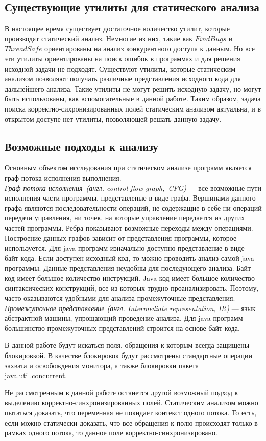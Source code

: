 \subsection{Существующие утилиты для статического анализа}
В настоящее время существует достаточное количество утилит, которые производят статический анализ. Немногие из них, такие как $FindBugs$\cite{FindBugs} и $ThreadSafe$ ориентированы на анализ конкурентного доступа к данным. Но все эти утилиты ориентированы на поиск ошибок в программах и для решения исходной задачи не подходят.
Существуют утилиты, которые статическим анализом позволяют получать различные представления исходного кода для дальнейшего анализа. Такие утилиты не могут решить исходную задачу, но могут быть использованы, как вспомогательные в данной работе. 
Таким образом, задача поиска корректно-сихронизированных полей статическим анализом актуальна, и в открытом доступе нет утилиты, позволяющей решать данную задачу. 
\subsection{Возможные подходы к анализу}
Основным объектом исследования при статическом анализе программ является граф потока исполнения выполнения. 
\\\emph{Граф потока исполнения\ (англ. control flow graph,\ CFG)} --- все возможные пути исполнения части программы, представленые в виде графа. Вершинами данного графа являются последовательности операций, не содержащие в себе ни операций передачи управления, ни точек, на которые управление передается из других частей программы. Ребра показывают возможные переходы между операциями.
Построение данных графов зависит от представления программы, которое используется. Для java программ изначально 
доступно представление в виде байт-кода. Если доступен исходный код, то можно проводить анализ самой java программы.
Данные представления неудобны для последующего анализа. Байт-код имеет большое количество инструкций.  Java код имеет большое количество синтаксических конструкций, все из которых трудно проанализировать. Поэтому, часто оказываются удобными для анализа промежуточные представления.
\\\emph{Промежуточное представление (англ. Intermediate representation, IR)} --- язык абстрактной машины, упрощающий проведение анализа. Для java программ большинство промежуточных представлений строится на основе байт-кода.

В данной работе будут искаться поля, обращения к которым всегда защищены блокировкой. В качестве блокировок будут рассмотрены стандартные операции захвата и освобождения монитора, а также блокировки пакета java.util.concurrent.


Не рассмотренным в данной работе останется другой возможный подход к выделению корректно-синхронизированных полей.
Статическим анализом можно пытаться доказать, что переменная не покидает контекст одного потока. То есть, если можно статически доказать, что все обращения к полю происходят только в рамках одного потока, то данное поле корректно-синхронизировано.
\FloatBarrier

